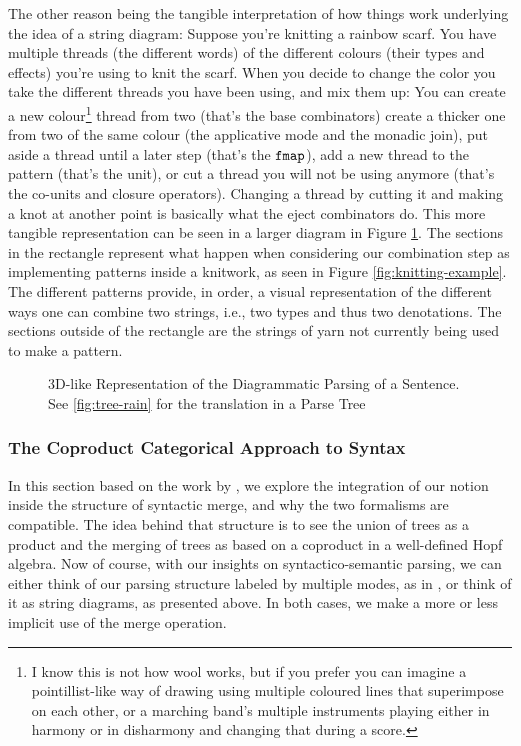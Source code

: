 The other reason being the tangible interpretation of how things work
underlying the idea of a string diagram:
Suppose you're knitting a rainbow scarf.
You have multiple threads (the different words) of the different colours (their
types and effects) you're using to knit the scarf.
When you decide to change the color you take the different threads you have
been using, and mix them up:
You can create a new colour\footnote{I know this is not how wool works, but
	if you prefer you can imagine a pointillist-like way of drawing using multiple
	coloured lines that superimpose on each other, or a marching band's multiple
	instruments playing either in harmony or in disharmony and changing that
	during a score.} thread from two (that's the base combinators) create a
thicker one from two of the same colour (the applicative mode and the monadic
join), put aside a thread until a later step (that's the $\texttt{fmap}$), add a new
thread to the pattern (that's the unit), or cut a thread you will not be
using anymore (that's the co-units and closure operators).
Changing a thread by cutting it and making a knot at another point is basically
what the eject combinators do.
This more tangible representation can be seen in a larger diagram in Figure
\ref{fig:3dparsing-diagram}.
The sections in the rectangle represent what happen when considering our
combination step as implementing patterns inside a knitwork, as seen in Figure
\ref{fig:knitting-example}.
The different patterns provide, in order, a visual representation of the
different ways one can combine two strings, i.e., two types and thus two
denotations.
The sections outside of the rectangle are the strings of yarn not currently
being used to make a pattern.

\begin{figure}
	\centering
	
	\caption{3D-like Representation of the Diagrammatic Parsing of a Sentence. See \ref{fig:tree-rain} for the translation in a Parse Tree}
	\label{fig:3dparsing-diagram}
\end{figure}

\subsubsection{The Coproduct Categorical Approach to Syntax}
\label{subsubsec:coprod}
In this section based on the work by
,
we explore the integration of our notion inside the structure of syntactic
merge, and why the two formalisms are compatible.
The idea behind that structure is to see the union of trees as a product and
the merging of trees as based on a coproduct in a well-defined Hopf algebra.
Now of course, with our insights on syntactico-semantic parsing, we can either
think of our parsing structure labeled by multiple modes, as in
\cite{bumfordEffectdrivenInterpretationFunctors2025}, or think of it as string
diagrams, as presented above.
In both cases, we make a more or less implicit use of the merge operation.

